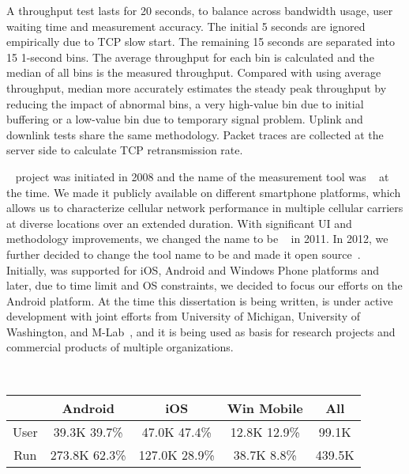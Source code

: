 A throughput test lasts for 20 seconds, to balance across bandwidth usage, user waiting time and measurement accuracy. The initial 5 seconds are ignored empirically due to TCP slow start. The remaining 15 seconds are separated into 15 1-second bins. The average throughput for each bin is calculated and the median of all bins is the measured throughput. Compared with using average throughput, median more accurately estimates the steady peak throughput by reducing the impact of abnormal bins, \eg a very high-value bin due to initial buffering or a low-value bin due to temporary signal problem. Uplink and downlink tests share the same methodology. Packet traces are collected at the server side to calculate TCP retransmission rate. 


\mobiperf~\cite{mobiperf} project was initiated in 2008 and the name of the measurement tool was \TT~\cite{mobiperf, mobisys.3gtest} at the time. We made it publicly available on different smartphone platforms, which allows us to characterize cellular network performance in multiple cellular carriers at diverse locations over an extended duration. With significant UI and methodology improvements, we changed the name to be \FT~\cite{4gtest} in 2011. In 2012, we further decided to change the tool name to be \mobiperf and made it open source~\cite{mobiperf.repo}. Initially, \mobiperf was supported for iOS, Android and Windows Phone platforms and later, due to time limit and OS constraints, we decided to focus our efforts on the Android platform. At the time this dissertation is being written, \mobiperf is under active development with joint efforts from University of Michigan, University of Washington, and M-Lab~\cite{mlab}, and it is being used as basis for research projects and commercial products of multiple organizations.

\begin{figure}[t]
\centering
{}\\ %
\label{fig:net.coverage}
\end{figure}

\begin{table} [t]
\begin{center}
\begin{tabular}{|c|c|c|c|c|}\hline
 & Android & iOS & Win Mobile & All\\\hline
User & 39.3K 39.7\% & 47.0K 47.4\% & 12.8K 12.9\% & 99.1K \\\hline
Run & 273.8K 62.3\% & 127.0K 28.9\% & 38.7K 8.8\% & 439.5K \\\hline
\end{tabular}
\label{tab:net.user}
\end{center}
\end{table}

